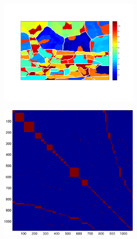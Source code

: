 \documentclass{article} %
\begin{document}
\begin{figure}
\begin{subfigure}[c]{\textwidth}
\begin{subfigure}[c]{0.195\textwidth}
			\label{fig:4_1_s_map}
		\end{subfigure}
		\begin{subfigure}[]{0.195\textwidth}
			\includegraphics[width = \textwidth]{./img/su4_1_s.pdf}
			\label{fig:4_1_s_su}
		\end{subfigure}
		\begin{subfigure}[c]{0.195\textwidth}
			\includegraphics[width = \textwidth]{./img/adj4_1_s.pdf}
			\label{fig4_1_s_adj}
		\end{subfigure}
	\end{subfigure}


\end{figure}
\end{document}
